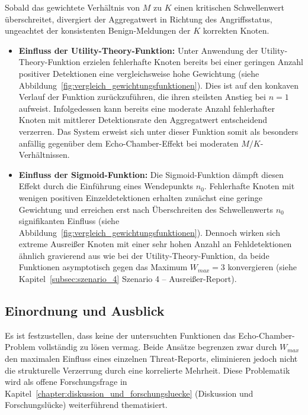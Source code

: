 Sobald das gewichtete Verhältnis von $M$ zu $K$ einen kritischen Schwellenwert überschreitet, divergiert der Aggregatwert in Richtung des Angriffsstatus, ungeachtet der konsistenten Benign-Meldungen der $K$ korrekten Knoten.

\begin{itemize}
    \item \textbf{Einfluss der Utility-Theory-Funktion:}
    Unter Anwendung der Utility-Theory-Funktion erzielen fehlerhafte Knoten bereits bei einer geringen Anzahl positiver Detektionen eine vergleichsweise hohe Gewichtung (siehe Abbildung~\ref{fig:vergleich_gewichtungsfunktionen}). Dies ist auf den konkaven Verlauf der Funktion zurückzuführen, die ihren steilsten Anstieg bei $n=1$ aufweist. Infolgedessen kann bereits eine moderate Anzahl fehlerhafter Knoten mit mittlerer Detektionsrate den Aggregatwert entscheidend verzerren. Das System erweist sich unter dieser Funktion somit als besonders anfällig gegenüber dem Echo-Chamber-Effekt bei moderaten $M/K$-Verhältnissen.
    
    \item \textbf{Einfluss der Sigmoid-Funktion:}
    Die Sigmoid-Funktion dämpft diesen Effekt durch die Einführung eines Wendepunkts $n_0$. Fehlerhafte Knoten mit wenigen positiven Einzeldetektionen erhalten zunächst eine geringe Gewichtung und erreichen erst nach Überschreiten des Schwellenwerts $n_0$ signifikanten Einfluss (siehe Abbildung~\ref{fig:vergleich_gewichtungsfunktionen}). Dennoch wirken sich extreme Ausreißer Knoten mit einer sehr hohen Anzahl an Fehldetektionen ähnlich gravierend aus wie bei der Utility-Theory-Funktion, da beide Funktionen asymptotisch gegen das Maximum $W_{max} = 3$ konvergieren (siehe Kapitel~\ref{subsec:szenario_4} Szenario 4 – Ausreißer-Report).
\end{itemize}

\subsection{Einordnung und Ausblick}
Es ist festzustellen, dass keine der untersuchten Funktionen das Echo-Chamber-Problem vollständig zu lösen vermag. Beide Ansätze begrenzen zwar durch $W_{max}$ den maximalen Einfluss eines einzelnen Threat-Reports, eliminieren jedoch nicht die strukturelle Verzerrung durch eine korrelierte Mehrheit. Diese Problematik wird als offene Forschungsfrage in Kapitel~\ref{chapter:diskussion_und_forschungsluecke} (Diskussion und Forschungslücke) weiterführend thematisiert.